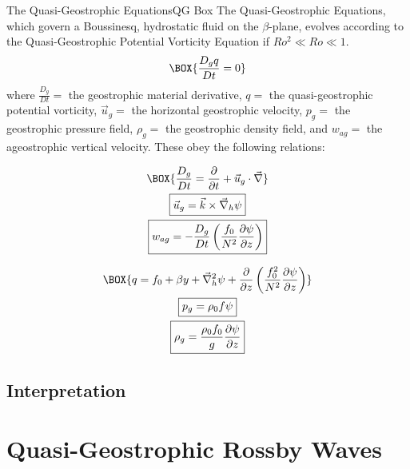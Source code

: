 \begin{fact}{The Quasi-Geostrophic Equations}{QG Box}\label{QG Box}
    The Quasi-Geostrophic Equations, which govern a Boussinesq, hydrostatic fluid on the $\beta$-plane, evolves according to the Quasi-Geostrophic Potential Vorticity Equation if $Ro^2\ll Ro \ll 1$.
    \begin{gather}
        \label{QGPV}
        \BOX{
            \frac{D_g q}{Dt} = 0
        }
    \end{gather}
    where $\frac{D_g}{Dt}=$ the geostrophic material derivative, $q=$ the quasi-geostrophic potential vorticity, $\vec{u}_g=$ the horizontal geostrophic velocity, $p_g=$ the geostrophic pressure field, $\rho_g=$ the geostrophic density field, and $w_{ag}=$ the ageostrophic vertical velocity. These obey the following relations:

    \begin{minipage}{0.42\linewidth}
        \begin{gather}
            \BOX{
                \frac{D_g}{Dt}=\frac{\partial }{\partial t}+ \vec{u}_g\cdot\vec{\nabla}
            }
            \\
            \boxed{\vec{u}_g = \vec{k}\times\vec{\nabla}_h\psi}
            \\
            \boxed{w_{ag}=-\frac{D_g}{Dt}\left( \frac{f_0}{N^2} \frac{\partial \psi}{\partial z}\right)}
        \end{gather}
    \end{minipage}
    \hfill
    \begin{minipage}{0.56\linewidth}
        \begin{gather}
            \BOX{
                q=f_0+\beta y + \vec{\nabla}_h^2 \psi + \frac{\partial }{\partial z}\left( \frac{f_0^2}{N^2} \frac{\partial \psi}{\partial z} \right)
            }
            \\
            \boxed{p_g = \rho_0 f \psi}
            \\
            \boxed{\rho_g = \frac{\rho_0 f_0}{g}\frac{\partial \psi}{\partial z}}
        \end{gather}
    \end{minipage}

\end{fact}

\subsection{Interpretation}

\section{Quasi-Geostrophic Rossby Waves}

